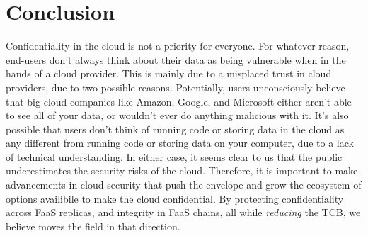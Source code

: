 \section{Conclusion}
\label{sec:conclusion}




Confidentiality in the cloud is not a priority for everyone.
For whatever reason, end-users don't always think about their data as being vulnerable when in the hands of a cloud provider.
This is mainly due to a misplaced trust in cloud providers, due to two possible reasons.
Potentially, users unconsciously believe that big cloud companies like Amazon, Google, and Microsoft either aren't able to see all of your data, or wouldn't ever do anything malicious with it.
It's also possible that users don't think of running code or storing data in the cloud as any different from running code or storing data on your computer, due to a lack of technical understanding.
In either case, it seems clear to us that the public underestimates the security risks of the cloud.
Therefore, it is important to make advancements in cloud security that push the envelope and grow the ecosystem of options availibile to make the cloud confidential.
By protecting confidentiality across FaaS replicas, and integrity in FaaS chains, all while \textit{reducing} the TCB, we believe \SystemName moves the field in that direction.
